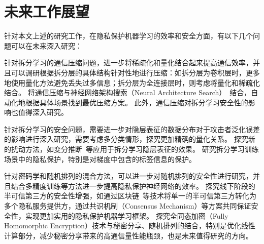 \section{未来工作展望}
针对本文上述的研究工作，在隐私保护机器学习的效率和安全方面，有以下几个问题可以在未来深入研究：
%

针对拆分学习的通信压缩问题，进一步将稀疏化和量化结合起来提高通信效率，并且可以调研根据拆分层的具体结构针对性地进行压缩：如拆分层为卷积层时，更多地使用量化方法避免丢失过多信息；拆分层为全连接层时，则考虑将量化和稀疏化结合。
将通信压缩与神经网络架构搜索（Neural Architecture Search）~\cite{renpengzhen_2021_nas_survey}结合，自动化地根据具体场景找到最优压缩方案。
此外，通信压缩对拆分学习安全性的影响也值得深入研究。

针对拆分学习的安全问题，需要进一步对隐层表征的数据分布对于攻击者泛化误差的影响进行深入研究，需要考虑多分类情形，探究更加精确的量化关系。
探究新的扰动方法，如变分推断~\cite{kingma_2014_vae,alemi_2022_deep_variational}等应用于拆分学习隐层表征的效果。
研究拆分学习训练场景中的隐私保护，特别是对梯度中包含的标签信息的保护。

针对密码学和随机排列的混合方法，可以进一步对随机排列的安全性进行研究，并且结合多精度训练等方法进一步提高隐私保护神经网络的效率。
%
探究线下阶段的半可信第三方的安全性增强，如通过区块链~\cite{belotti_2019_blockchain}等技术将单一的半可信第三方转化为多个隐私服务提供方，通过共识机制（Consensus Mechanism）等方案共同保证安全性，实现更加实用的隐私保护机器学习框架。
%
探究全同态加密（Fully Homomorphic Encryption）技术与秘密分享、随机排列的结合，特别是优化线性计算部分，减少秘密分享带来的高通信量性能瓶颈，也是未来值得研究的方向。